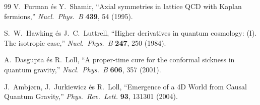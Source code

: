 \documentclass[11pt,a4paper]{article}
\begin{document}
\begin{thebibliography}{99}
V.~Furman és Y.~Shamir, ``Axial symmetries in lattice QCD with Kaplan fermions,'' \emph{Nucl.\ Phys.\ B} \textbf{439}, 54 (1995).

S.~W.~Hawking és J.~C.~Luttrell, ``Higher derivatives in quantum cosmology: (I). The isotropic case,'' \emph{Nucl.\ Phys.\ B} \textbf{247}, 250 (1984).

A.~Dasgupta és R.~Loll, ``A proper-time cure for the conformal sickness in quantum gravity,'' \emph{Nucl.\ Phys.\ B} \textbf{606}, 357 (2001).

J.~Ambj\o rn, J.~Jurkiewicz és R.~Loll, ``Emergence of a 4D World from Causal Quantum Gravity,'' \emph{Phys.\ Rev.\ Lett.} \textbf{93}, 131301 (2004).

\end{thebibliography}
\end{document}
